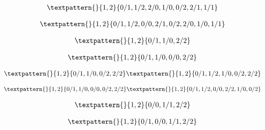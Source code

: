 \begin{equation}
	\begin{gathered}
		\textpattern{}{1,2}{0/1,1/2,2/0,1/0,0/2,2/1,1/1}
	\end{gathered}
	\label{cls:86}
\end{equation}

\begin{equation}
	\begin{gathered}
		\textpattern{}{1,2}{0/1,1/2,0/0,2/1,0/2,2/0,1/0,1/1}
	\end{gathered}
	\label{cls:87}
\end{equation}

\begin{equation}
	\begin{gathered}
		\textpattern{}{1,2}{0/1,1/0,2/2}
	\end{gathered}
	\label{cls:88}
\end{equation}

\begin{equation}
	\begin{gathered}
		\textpattern{}{1,2}{0/1,1/0,0/0,2/2}
	\end{gathered}
	\label{cls:89}
\end{equation}

\begin{equation}
	\begin{gathered}
		\textpattern{}{1,2}{0/1,1/0,0/2,2/2}
		\textpattern{}{1,2}{0/1,1/2,1/0,0/2,2/2}
	\end{gathered}
	\label{cls:90}
\end{equation}

\begin{equation}
	\begin{gathered}
		\textpattern{}{1,2}{0/1,1/0,0/0,0/2,2/2}
		\textpattern{}{1,2}{0/1,1/2,0/0,2/2,1/0,0/2}
	\end{gathered}
	\label{cls:91}
\end{equation}

\begin{equation}
	\begin{gathered}
		\textpattern{}{1,2}{0/0,1/1,2/2}
	\end{gathered}
	\label{cls:92}
\end{equation}

\begin{equation}
	\begin{gathered}
		\textpattern{}{1,2}{0/1,0/0,1/1,2/2}
	\end{gathered}
	\label{cls:93}
\end{equation}

